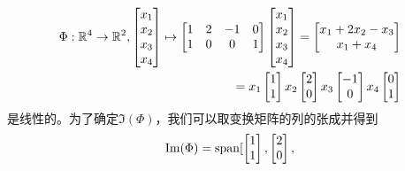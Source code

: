 \begin{example}[线性映射的像与核]
    \begin{subequations}
    \begin{align}
        \Phi:\mathbb{R}^4 \rightarrow \mathbb{R}^2,
        \begin{bmatrix}
            x_1 \\ x_2 \\ x_3 \\ x_4 \\
        \end{bmatrix}
        \mapsto
        \begin{bmatrix}
            1 & 2 & -1 & 0 \\
            1 & 0 & 0 & 1
        \end{bmatrix}
        \begin{bmatrix}
            x_1 \\ x_2 \\ x_3 \\ x_4 \\
        \end{bmatrix}
        =
        \begin{bmatrix}
            x_1 + 2x_2 - x_3 \\
            x_1 + x_4
        \end{bmatrix}\\
        =
        x_1 \begin{bmatrix} 1 \\ 1 \end{bmatrix}
        x_2 \begin{bmatrix} 2 \\ 0 \end{bmatrix}
        x_3 \begin{bmatrix} -1 \\ 0 \end{bmatrix}
        x_4 \begin{bmatrix} 0 \\ 1 \end{bmatrix}
    \end{align}
    \end{subequations}
    是线性的。为了确定$\Im(\Phi)$，我们可以取变换矩阵的列的张成并得到
    \begin{equation}
        \Im(\Phi) = \spn[
            \begin{bmatrix} 1 \\ 1 \end{bmatrix},
            \begin{bmatrix} 2 \\ 0 \end{bmatrix},

\end{equation}
\end{example}

